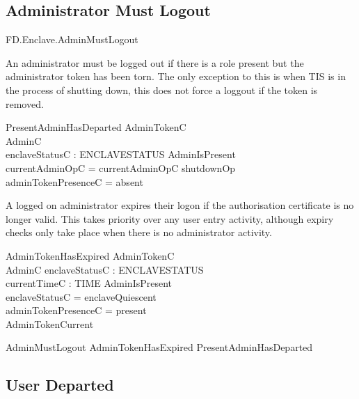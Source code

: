 \subsection{Administrator Must Logout}

\begin{traceunit}{FD.Enclave.AdminMustLogout}
\end{traceunit}

An administrator must be logged out if there is a role present but the
administrator token has been torn. The only exception to this is when
TIS is in the process of shutting down, this does not force a loggout
if the token is removed.

\begin{schema}{PresentAdminHasDeparted}
        AdminTokenC
\\      AdminC
\\      enclaveStatusC : ENCLAVESTATUS
\where
        AdminIsPresent
\\      currentAdminOpC = \Nil \lor \The currentAdminOpC \neq shutdownOp 
\\      adminTokenPresenceC = absent
\end{schema}

A logged on administrator expires their logon if the authorisation
certificate is no longer valid. This takes priority over any user
entry activity, although expiry checks only take place when there is
no administrator activity.

\begin{schema}{AdminTokenHasExpired}
        AdminTokenC
\\      AdminC
\also
        enclaveStatusC : ENCLAVESTATUS
\\      currentTimeC : TIME
\where
        AdminIsPresent
\\      enclaveStatusC = enclaveQuiescent
\\      adminTokenPresenceC = present
\\      \lnot AdminTokenCurrent
\end{schema}

\begin{zed}
        AdminMustLogout  AdminTokenHasExpired \lor
        PresentAdminHasDeparted 
\end{zed}


\subsection{User Departed}


